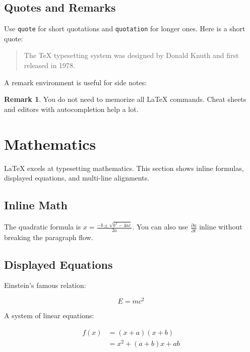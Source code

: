 \documentclass[11pt]{article}
\theoremstyle{definition}
\newtheorem{remark}[definition]{Remark}
\theoremstyle{plain}
\begin{document}
\subsection{Quotes and Remarks}
\label{sec:text:quotes}

Use \texttt{quote} for short quotations and \texttt{quotation} for
longer ones.
Here is a short quote:

\begin{quote}
    \small
    The \TeX{} typesetting system was designed by Donald Knuth
    and first released in 1978.
\end{quote}

A remark environment is useful for side notes:

\begin{remark}
    You do not need to memorize all \LaTeX{} commands.
    Cheat sheets and editors with autocompletion help a lot.
\end{remark}

\section{Mathematics}
\label{sec:math}

\LaTeX{} excels at typesetting mathematics.
This section shows inline formulas, displayed equations, and
multi-line alignments.

\subsection{Inline Math}
\label{sec:math:inline}

The quadratic formula is $x = \frac{-b \pm \sqrt{b^2 - 4ac}}{2a}$.
You can also use \(\frac{\partial u}{\partial t}\) inline without
breaking the paragraph flow.

\subsection{Displayed Equations}
\label{sec:math:display}

Einstein's famous relation:

\begin{equation}
    \label{eq:einstein}
    E = mc^2
\end{equation}

A system of linear equations:

\begin{align}
    \label{eq:linear}
    f(x) &= (x+a)(x+b) \nonumber \\
         &= x^2 + (a+b)x + ab
\end{align}
\end{document}
